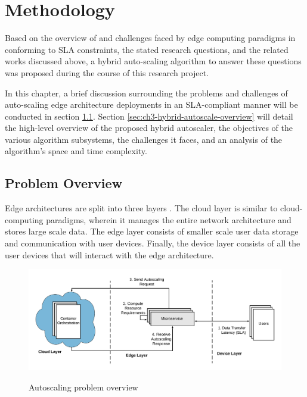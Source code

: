 \clearpage

\def\chaptertitle{Methodology}

\lhead{\emph{\chaptertitle}}

\chapter{\chaptertitle}
\label{ch:methodology}

Based on the overview of and challenges faced by edge computing paradigms in conforming to SLA constraints, the stated research questions, and the related works discussed above, a hybrid auto-scaling algorithm to answer these questions was proposed during the course of this research project.\par

In this chapter, a brief discussion surrounding the problems and challenges of auto-scaling edge architecture deployments in an SLA-compliant manner will be conducted in section \ref{sec:ch3-problem-overview}. Section \ref{sec:ch3-hybrid-autoscale-overview} will detail the high-level overview of the proposed hybrid autoscaler, the objectives of the various algorithm subsystems, the challenges it faces, and an analysis of the algorithm's space and time complexity.

\section{Problem Overview}
\label{sec:ch3-problem-overview}

Edge architectures are split into three layers \cite{hamdan2020edge}. 
The cloud layer is similar to cloud-computing paradigms, wherein it manages the entire network architecture and stores large scale data. The edge layer consists of smaller scale user data storage and communication with user devices. Finally, the device layer consists of all the user devices that will interact with the edge architecture.\par

\begin{figure}[htb]
    \centering
    \caption{Autoscaling problem overview}
    \includegraphics[width=1.0\linewidth]{Figures/Problem-Overview.pdf}
    \label{fig:autoscaling-problem-overview}
\end{figure}

